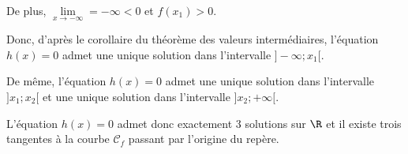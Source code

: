 \begin{enumerate}
		De plus, $\lim\limits_{x\to -\infty } = -\infty <0 $ et $f(x_1)>0$.

		Donc, d'après le corollaire du théorème des valeurs intermédiaires, l'équation $h(x) = 0$ admet une unique solution dans l'intervalle $]-\infty ; x_1[$.

		\medskip

		De même, l'équation $h(x) = 0$ admet une unique solution dans l'intervalle $]x_1 ; x_2[$
		et une unique solution dans l'intervalle $]x_2 ; +\infty[$.

		L'équation $h(x)=0$ admet donc exactement 3 solutions sur $\R$ et il existe trois tangentes à la courbe $\mathcal{C}_f$ passant par l'origine du repère.

	\end{enumerate}
